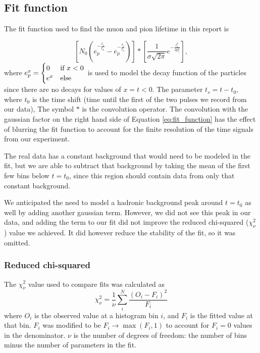 \documentclass[11pt,a4paper]{article}
\begin{document}
\subsection{Fit function}

The fit function used to find the muon and pion lifetime in this report is

\begin{equation}\label{eq:fit_function}
\left[N_0 \left(e_p^{-\frac{t_s}{t_{\mu}}} - e_p^{-\frac{t_s}{t_{\pi}}}\right)\right]
* \left[\frac{1}{\sigma\sqrt{2\pi}}e^{-\frac{t_s^2}{2p_1^2}}\right]
,\end{equation}
where \(e_p^x = \begin{cases}
0 & \textnormal{if }x < 0 \\
e^x & \textnormal{else}
\end{cases}\) is used to model the decay function of the particles since there are no decays for values of \(x=t<0\).
The parameter \(t_s = t - t_0\), where \(t_0\) is the time shift (time until the first of the two pulses we record from our data),
 The symbol \(*\) is the convolution operator. The convolution with the gaussian factor on the right hand side of Equation \ref{eq:fit_function} has the effect of blurring the fit function to account for the finite resolution of the time signals from our experiment. 

The real data has a constant background that would need to be modeled in the fit, but we are able to subtract that background by taking the mean of the first few bins below \(t = t_0\), since this region should contain data from only that constant background.

We anticipated the need to model a hadronic background peak around \(t=t_0\) as well by adding another gaussian term. However, we did not see this peak in our data, and adding the term to our fit did not improve the reduced chi-squared (\(\chi_\nu^2\)) value we achieved. It did however reduce the stability of the fit, so it was omitted.  


\subsubsection{Reduced chi-squared}
The \(\chi_\nu^2\) value used to compare fits was calculated as
\[
\chi_\nu^2 = \frac{1}{\nu}\sum_i^N\frac{(O_i - F_i)^2}{F_i}
\]
where \(O_i\) is the observed value at a histogram bin \(i\), and \(F_i\) is the fitted value at that bin.
\(F_i\) was modified to be \(F_i \to \max(F_i,  1)\) to account for \(F_i=0\) values in the denominator.
\(\nu\) is the number of degrees of freedom: the number of bins minus the number of parameters in the fit.
\end{document}
